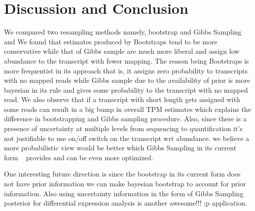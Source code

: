 \documentclass{article}
\begin{document}
\section{Discussion and Conclusion}


We compared two resampling methods namely, bootstrap and Gibbs Sampling and We found that estimates produced by Bootstraps tend to be more conservative while that of Gibbs sample are much more liberal and
assign low abundance to the transcript with fewer mapping. The reason being Bootstraps is more frequentist in its approach that is,
it assigns zero probability to transcripts with no mapped reads while Gibbs sample due to the availability of prior is more
bayesian in its rule and gives some probability to the transcript with no mapped read. We also observe that if a transcript
with short length gets assigned with some reads can result in a big bump in overall TPM estimates which explains the difference in
bootstrapping and Gibbs sampling procedure. Also, since there is a presence of uncertainty at multiple levels from sequencing to quantification it's not justifiable to use on/off switch on the transcript wrt abundance. we believe a more probabilistic view would be better which Gibbs Sampling in its current form ~\citep{Turro2011mmseq} provides and can be even more optimized.

One interesting future direction is since the bootstrap in its current form does not have prior information we can make bayesian
bootstrap to account for prior information. Also using uncertainty information in the form of Gibbs Sampling posterior for
differential expression analysis is another awesome!!! ;p application.
\end{document}
